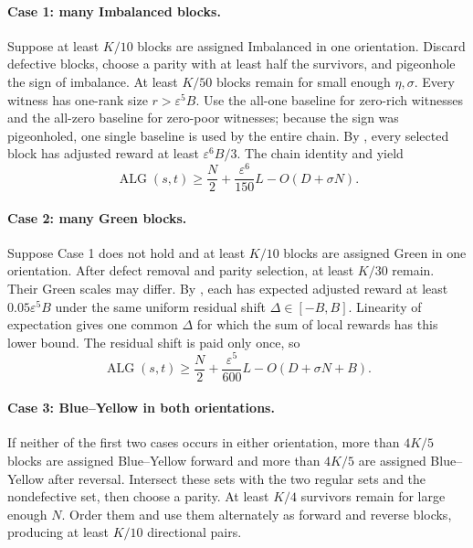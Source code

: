 \documentclass[11pt]{article}
\theoremstyle{remark}
\newcommand{\eps}{\varepsilon}
\begin{document}
\paragraph{Case 1: many Imbalanced blocks.}
Suppose at least $K/10$ blocks are assigned Imbalanced in one orientation.
Discard defective blocks, choose a parity with at least half the survivors,
and pigeonhole the sign of imbalance.  At least $K/50$ blocks remain for
small enough $\eta,\sigma$.  Every witness has one-rank size
$r>\eps^5B$.  Use the all-one baseline for zero-rich witnesses and the
all-zero baseline for zero-poor witnesses; because the sign was
pigeonholed, one single baseline is used by the entire chain.  By
, every
selected block has adjusted reward at least $\eps^6B/3$.  The chain identity
and  yield
\begin{equation}\label{eq:I-gain}
 \operatorname{ALG}(s,t)
 \ge\frac N2+\frac{\eps^6}{150}L-O(D+\sigma N).
\end{equation}

\paragraph{Case 2: many Green blocks.}
Suppose Case 1 does not hold and at least $K/10$ blocks are assigned Green in
one orientation.  After defect removal and parity selection, at least $K/30$
remain.  Their Green scales may differ.  By
, each has expected adjusted reward
at least $0.05\eps^5B$ under the same uniform residual shift
$\Delta\in[-B,B]$.  Linearity of expectation gives one common $\Delta$ for
which the sum of local rewards has this lower bound.  The residual shift is
paid only once, so
\begin{equation}\label{eq:G-gain}
 \operatorname{ALG}(s,t)
 \ge\frac N2+\frac{\eps^5}{600}L-O(D+\sigma N+B).
\end{equation}

\paragraph{Case 3: Blue--Yellow in both orientations.}
If neither of the first two cases occurs in either orientation, more than
$4K/5$ blocks are assigned Blue--Yellow forward and more than $4K/5$ are
assigned Blue--Yellow after reversal.  Intersect these sets with the two
regular sets and the nondefective set, then choose a parity.  At least $K/4$
survivors remain for large enough $N$.  Order them and use them alternately
as forward and reverse blocks, producing at least $K/10$ directional pairs.
\end{document}
